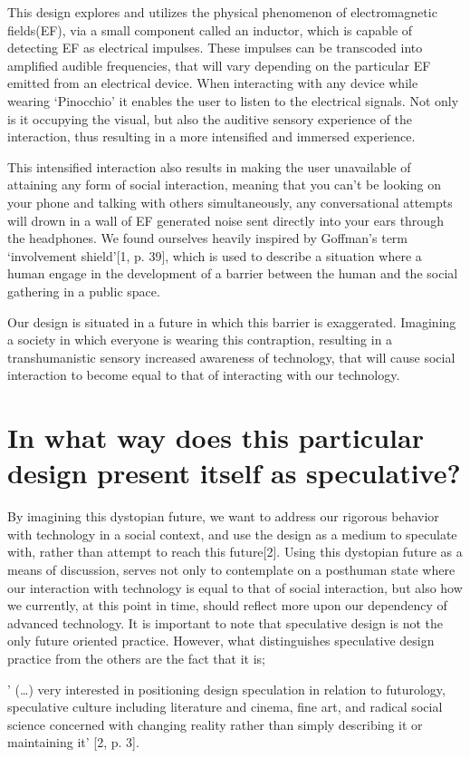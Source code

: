 \documentclass[journal]{IEEEtran}
\begin{document}
This design explores and utilizes the physical phenomenon of electromagnetic fields(EF), via a small component called an inductor, which is capable of detecting EF as electrical impulses. These impulses can be transcoded into amplified audible frequencies, that will vary depending on the particular EF emitted from an electrical device. When interacting with any device while wearing ‘Pinocchio’ it enables the user to listen to the electrical signals. Not only is it occupying the visual, but also the auditive sensory experience of the interaction, thus resulting in a more intensified and immersed experience.

This intensified interaction also results in making the user unavailable of attaining any form of social interaction, meaning that you can’t be looking on your phone and talking with others simultaneously, any conversational attempts will drown in a wall of EF generated noise sent directly into your ears through the headphones. We found ourselves heavily inspired by Goffman’s term ‘involvement shield’[1, p. 39], which is used to describe a situation where a human engage in the development of a barrier between the human and the social gathering in a public space.

Our design is situated in a future in which this barrier is exaggerated. Imagining a society in which everyone is wearing this contraption, resulting in a transhumanistic sensory increased awareness of technology, that will cause social interaction to become equal to that of interacting with our technology.

\section{In what way does this particular design present itself as speculative?}
By imagining this dystopian future, we want to address our rigorous behavior with technology in a social context, and use the design as a medium to speculate with, rather than attempt to reach this future[2]. Using this dystopian future as a means of discussion, serves not only to contemplate on a posthuman state where our interaction with technology is equal to that of social interaction, but also how we currently, at this point in time, should reflect more upon our dependency of advanced technology. It is important to note that speculative design is not the only future oriented practice. However, what distinguishes speculative design practice from the others are the fact that it is;

’ (…) very interested in positioning design speculation in relation to futurology, speculative culture including literature and cinema, fine art, and radical social science concerned with changing reality rather than simply describing it or maintaining it’ [2, p. 3].
\end{document}
